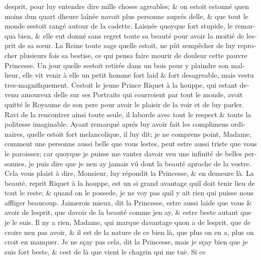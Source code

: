 \documentclass[14pt,a4paper]{memoir}
\begin{document}
\begin{otherlanguage}{french}
d\textquotesingle esprit, pour luy entendre dire mille choses agreables;
\& on estoit estonné qu\textquotesingle en moins d\textquotesingle un
quart d\textquotesingle heure l\textquotesingle aînée
n\textquotesingle avoit plus personne auprés d\textquotesingle elle, \&
que tout le monde s\textquotesingle estoit rangé autour de la cadette.
L\textquotesingle aisnée quoyque fort stupide, le remarqua bien, \& elle
eut donné sans regret toute sa beauté pour avoir la moitié de
l\textquotesingle esprit de sa sœur. La Reine toute sage
qu\textquotesingle elle estoit, ne pût s\textquotesingle empêcher de luy
reprocher plusieurs fois sa bestise, ce qui pensa faire mourir de
douleur cette pauvre Princesse. Un jour qu\textquotesingle elle
s\textquotesingle estoit retirée dans un bois pour y plaindre son
malheur, elle vit venir à elle un petit homme fort laid \& fort
desagreable, mais vestu tres-magnifiquement. C\textquotesingle estoit le
jeune Prince Riquet à la houppe, qui estant devenu amoureux
d\textquotesingle elle sur ses Portraits qui courroient par tout le
monde, avoit quitté le Royaume de son pere pour avoir le plaisir de la
voir et de luy parler. Ravi de la rencontrer ainsi toute seule, il
l\textquotesingle aborde avec tout le respect \& toute la politesse
imaginable. Ayant remarqué aprés luy avoir fait les complimens
ordinaires, qu\textquotesingle elle estoit fort melancolique, il luy
dit; je ne comprens point, Madame, comment une personne aussi belle que
vous l\textquotesingle estes, peut estre aussi triste que vous le
paroissez; car quoyque je puisse me vanter d\textquotesingle avoir veu
une infinité de belles personnes, je puis dire que je
n\textquotesingle en ay jamais vû dont la beauté aproche de la vostre.
Cela vous plaist à dire, Monsieur, luy répondit la Princesse, \& en
demeure là. La beauté, reprit Riquet à la houppe, est un si grand
avantage qu\textquotesingle il doit tenir lieu de tout le reste; \&
quand on le possede, je ne voy pas qu\textquotesingle il y ait rien qui
puisse nous affliger beaucoup. J\textquotesingle aimerois mieux, dit la
Princesse, estre aussi laide que vous \& avoir de
l\textquotesingle esprit, que d\textquotesingle avoir de la beauté comme
j\textquotesingle en ay, \& estre beste autant que je le suis. Il
n\textquotesingle y a rien, Madame, qui marque davantage
qu\textquotesingle on a de l\textquotesingle esprit, que de croire
n\textquotesingle en pas avoir, \& il est de la nature de ce bien là,
que plus on en a, plus on croit en manquer. Je ne sçay pas cela, dit la
Princesse, mais je sçay bien que je suis fort beste, \&
c\textquotesingle est de là que vient le chagrin qui me tuë. Si ce

\end{otherlanguage}
\end{document}
